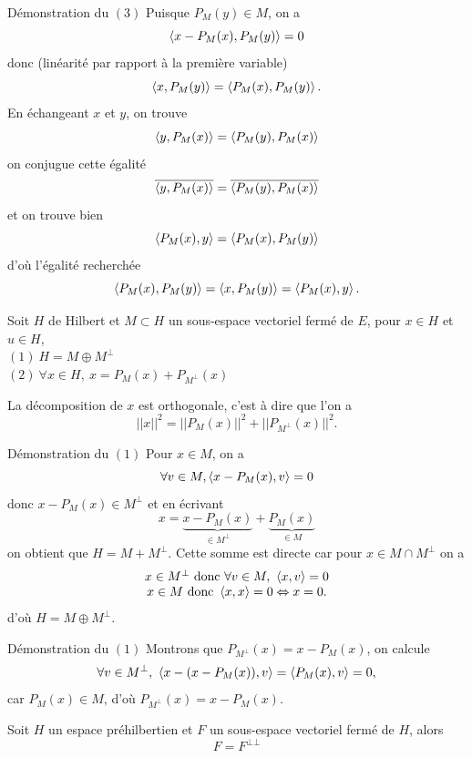 \documentclass[a4paper,11pt, twoside]{article}
\begin{document}
\begin{ProofC}{Démonstration du $(\mathit 3)$}
  Puisque $P_M(y)\in M$, on a 
  $$\left\langle x-P_M(x),P_M(y) \right\rangle=0$$
  donc (linéarité par rapport à la première variable)
  $$\left\langle x,P_M(y) \right\rangle=\left\langle P_M(x),P_M(y) \right\rangle.$$
  En échangeant $x$ et $y$, on trouve
  $$\left\langle y,P_M(x) \right\rangle=\left\langle P_M(y),P_M(x) \right\rangle$$
  on conjugue cette égalité
  $$\overline{\left\langle y,P_M(x) \right\rangle}=\overline{\left\langle P_M(y),P_M(x) \right\rangle}$$
  et on trouve bien 
  $$\left\langle P_M(x),y \right\rangle=\left\langle P_M(x),P_M(y) \right\rangle$$
  d'où l'égalité recherchée 
  $$\left\langle P_M(x),P_M(y) \right\rangle=\left\langle x,P_M(y) \right\rangle=\left\langle P_M(x),y \right\rangle.$$
\end{ProofC}


\begin{corollaire}
  Soit $H$ de Hilbert et $M\subset H$ un sous-espace vectoriel fermé de $E$, pour $x\in H$ et $u\in H$,\\
  
  $(\mathit 1)\ H=M\oplus M^\bot$\\
  $(\mathit 2)\ \forall x\in H,\ x=P_M(x)+P_{M^\bot}(x)$\\
\end{corollaire}


\begin{RQ}
  La décomposition de $x$ est orthogonale, c'est à dire que l'on a 
  $$||x||^2=||P_M(x)||^2+||P_{M^\bot}(x)||^2.$$
\end{RQ}


\begin{ProofC}{Démonstration du $(\mathit 1)$}
  Pour $x\in M$, on a 
  $$\forall v\in M, \left\langle x-P_M(x),v \right\rangle=0$$
  donc $x-P_M(x)\in M^\bot$ et en écrivant 
  $$x=\underbrace{x-P_M(x)}_{\in M^\bot}+\underbrace{P_M(x)}_{\in M}$$
  on obtient que $H=M+M^\bot.$ Cette somme est directe car pour $x\in M\cap M^\bot$ on a 
  $$\begin{array}{c}
    x\in M^\bot\text{ donc }\forall v\in M,\ \left\langle x,v \right\rangle=0\\
    x\in M\text{ donc }\left\langle x,x \right\rangle=0\Leftrightarrow x=0.
  \end{array}$$
  d'où $H=M\oplus M^\bot$.
\end{ProofC}


\begin{ProofC}{Démonstration du $(\mathit 1)$}
  Montrons que $P_{M^\bot}(x)=x-P_M(x)$, on calcule
  $$\forall v\in M^\bot,\ \ps{x-(x-P_M(x)),v}=\ps{P_M(x),v}=0,$$
  car $P_M(x)\in M$, d'où $P_{M^\bot}(x)=x-P_M(x)$.
\end{ProofC}



\begin{prop}
  Soit $H$ un espace préhilbertien et $F$ un sous-espace vectoriel fermé de $H$, alors\\
  
  $$F=F^{\bot\bot}$$
\end{prop}
\end{document}
